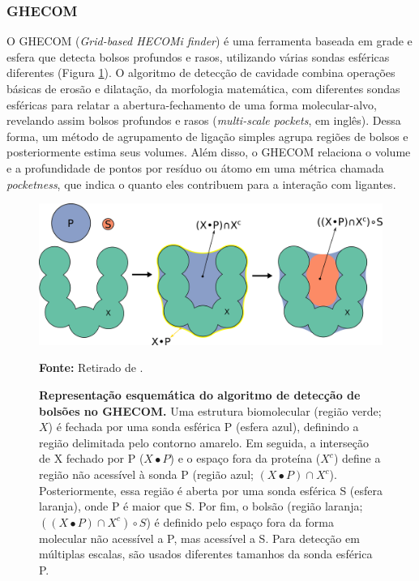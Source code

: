 \documentclass[Portugues]{phdquali}
\begin{document}
\subsubsection{GHECOM}

O GHECOM (\textit{Grid-based HECOMi finder}) \cite{ghecom} é uma ferramenta baseada em grade e esfera que detecta bolsos profundos e rasos, utilizando várias sondas esféricas diferentes (Figura \ref{fig:ghecom-schema}). O algoritmo de detecção de cavidade combina operações básicas de erosão e dilatação, da morfologia matemática, com diferentes sondas esféricas para relatar a abertura-fechamento de uma forma molecular-alvo, revelando assim bolsos profundos e rasos (\textit{multi-scale pockets}, em inglês). Dessa forma, um método de agrupamento de ligação simples agrupa regiões de bolsos e posteriormente estima seus volumes. Além disso, o GHECOM relaciona o volume e a profundidade de pontos por resíduo ou átomo em uma métrica chamada \textit{pocketness}, que indica o quanto eles contribuem para a interação com ligantes.

\begin{figure}[ht]
  \centerline{\includegraphics[scale=0.6]{images/ghecom-schema.png}}
  \centerline{\scriptsize{\textbf{Fonte:} Retirado de \cite{guerra2023B}.}}
  \caption[Representação esquemática do algoritmo de detecção de bolsões no GHECOM]{\textbf{Representação esquemática do algoritmo de detecção de bolsões no GHECOM.} Uma estrutura biomolecular (região verde; $X$) é fechada por uma sonda esférica P (esfera azul), definindo a região delimitada pelo contorno amarelo. Em seguida, a interseção de X fechado por P ($X \bullet P$) e o espaço fora da proteína ($X^c$) define a região não acessível à sonda P (região azul; $(X \bullet P) \cap X^c$). Posteriormente, essa região é aberta por uma sonda esférica S (esfera laranja), onde P é maior que S. Por fim, o bolsão (região laranja; $((X \bullet P) \cap X^c) \circ S$) é definido pelo espaço fora da forma molecular não acessível a P, mas acessível a S. Para detecção em múltiplas escalas, são usados diferentes tamanhos da sonda esférica P.}
  \label{fig:ghecom-schema}
\end{figure}
\end{document}
